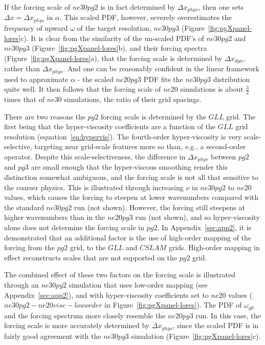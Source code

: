 \documentclass{agujournal}
\begin{document}
If the forcing scale of $ne30pg2$ is in fact determined by $\Delta x_{phys}$, then one sets $\Delta x = \Delta x_{phys}$ in $\alpha$. This scaled PDF, however, severely overestimates the frequency of upward $\omega$ of the target resolution, $ne30pg3$ (Figure~\ref{fig:pgXpanel-lores}c). It is clear from the similarity of the un-scaled PDF's of $ne30pg2$ and $ne30pg3$ (Figure~\ref{fig:pgXpanel-lores}b), and their forcing spectra (Figure~\ref{fig:pgXpanel-lores}a), that the forcing scale is determined by $\Delta x_{dyn}$, rather than $\Delta x_{phys}$. And one can be reasonably confident in the linear framework used to approximate $\alpha$ - the scaled $ne20pg3$ PDF fits the $ne30pg3$ distribution quite well. It then follows that the forcing scale of $ne20$ simulations is about $\frac{3}{2}$ times that of $ne30$ simulations, the ratio of their grid spacings.

There are two reasons the $pg2$ forcing scale is determined by the $GLL$ grid. The first being that the hyper-viscosity coefficients are a function of the $GLL$ grid resolution (equation~\ref{eq:hypervis}). The fourth-order hyper-viscosity is very scale-selective, targeting near grid-scale features more so than, e.g., a second-order operator. Despite this scale-selectiveness, the difference in $\Delta x_{phys}$ between $pg2$ and $pg3$ are small enough that the hyper-viscous smoothing render this distinction somewhat ambiguous, and the forcing scale is not all that sensitive to the coarser physics. This is illustrated through increasing $\nu$ in $ne30pg2$ to $ne20$ values, which causes the forcing to steepen at lower wavenumbers compared with the standard $ne30pg2$ run (not shown). However, the forcing still steepens at higher wavenumbers than in the $ne20pg3$ run (not shown), and so hyper-viscosity alone does not determine the forcing scale in $pg2$. In Appendix~\ref{sec:app2}, it is demonstrated that an additional factor is the use of high-order mapping of the forcing from the $pg2$ grid, to the $GLL$ and $CSLAM$ grids. High-order mapping in effect reconstructs scales that are not supported on the $pg2$ grid.

The combined effect of these two factors on the forcing scale is illustrated through an $ne30pg2$ simulation that uses low-order mapping (see Appendix~\ref{sec:app2}), and with hyper-viscosity coefficients set to $ne20$ values ($ne30pg2-ne20visc-loworder$ in Figure~\ref{fig:pgXpanel-lores}). The PDF of $\omega_{gll}$ and the forcing spectrum more closely resemble the $ne20pg3$ run. In this case, the forcing scale is more accurately determined by $\Delta x_{phys}$, since the scaled PDF is in fairly good agreement with the $ne30pg3$ simulation (Figure~\ref{fig:pgXpanel-lores}c).
\end{document}
